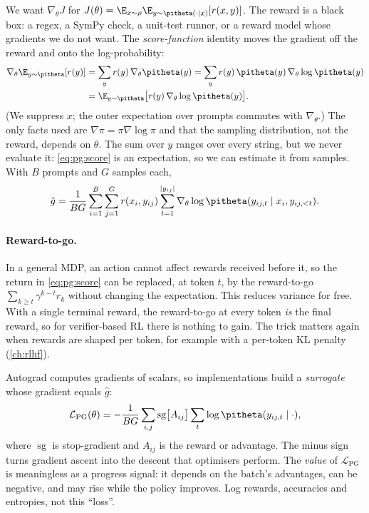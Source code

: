 We want $\nabla_\theta J$ for $J(\theta)=\E_{x\sim\rho}\E_{y\sim\pitheta(\cdot\mid x)}[r(x,y)]$.
The reward is a black box: a regex, a SymPy check, a unit-test runner, or a reward model whose
gradients we do not want. The \emph{score-function} identity moves the gradient off the
reward and onto the log-probability:
\begin{align}
\nabla_\theta \E_{y\sim\pitheta}[r(y)]
 &=\sum_y r(y)\,\nabla_\theta\pitheta(y)
  =\sum_y r(y)\,\pitheta(y)\,\nabla_\theta\log\pitheta(y)\nonumber\\
 &=\E_{y\sim\pitheta}\big[r(y)\,\nabla_\theta\log\pitheta(y)\big].
\label{eq:pg:score}
\end{align}
(We suppress $x$; the outer expectation over prompts commutes with $\nabla_\theta$.) The
only facts used are $\nabla\pi=\pi\nabla\log\pi$ and that the sampling distribution, not
the reward, depends on $\theta$. The sum over $y$ ranges over every string, but we never
evaluate it: \cref{eq:pg:score} is an expectation, so we can estimate it from samples. With
$B$ prompts and $G$ samples each,
\begin{equation}
\hat g=\frac{1}{BG}\sum_{i=1}^{B}\sum_{j=1}^{G} r(x_i,y_{ij})\sum_{t=1}^{|y_{ij}|}
\nabla_\theta\log\pitheta(y_{ij,t}\mid x_i,y_{ij,<t}).
\label{eq:pg:reinforce}
\end{equation}

\paragraph{Reward-to-go.} In a general MDP, an action cannot affect rewards received before
it, so the return in \cref{eq:pg:score} can be replaced, at token $t$, by the reward-to-go
$\sum_{k\ge t}\gamma^{k-t}r_k$ without changing the expectation. This reduces variance for
free. With a single terminal reward, the reward-to-go at every token \emph{is} the final
reward, so for verifier-based RL there is nothing to gain. The trick matters again when
rewards are shaped per token, for example with a per-token KL penalty (\cref{ch:rlhf}).

\begin{keyidea}
Autograd computes gradients of scalars, so implementations build a \emph{surrogate} whose
gradient equals $\hat g$:
\[
\mathcal{L}_{\text{PG}}(\theta)=-\frac{1}{BG}\sum_{i,j}\operatorname{sg}\!\big[A_{ij}\big]
\sum_t\log\pitheta(y_{ij,t}\mid\cdot),
\]
where $\operatorname{sg}$ is stop-gradient and $A_{ij}$ is the reward or advantage. The
minus sign turns gradient ascent into the descent that optimisers perform. The
\emph{value} of $\mathcal{L}_{\text{PG}}$ is meaningless as a progress signal: it depends on
the batch's advantages, can be negative, and may rise while the policy improves. Log rewards,
accuracies and entropies, not this ``loss''.
\end{keyidea}

